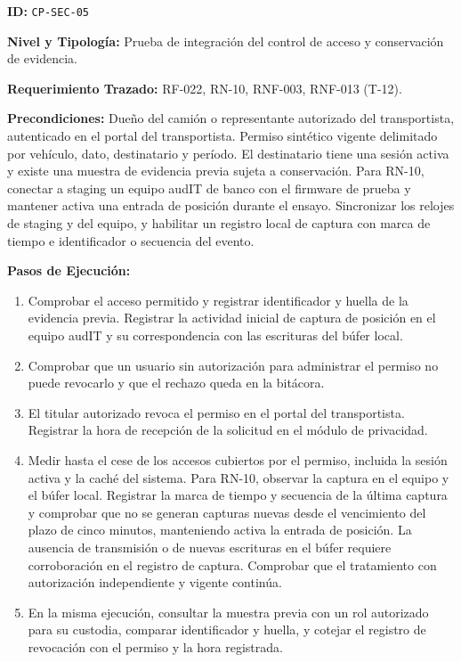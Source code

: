 \par\noindent\textbf{ID:} \texttt{C\allowbreak{}P\allowbreak{}-\allowbreak{}S\allowbreak{}E\allowbreak{}C\allowbreak{}-\allowbreak{}0\allowbreak{}5\allowbreak{}}\par
\par\noindent\textbf{Nivel y Tipología:} Prueba de integración del control de acceso y conservación de evidencia.\par
\par\noindent\textbf{Requerimiento Trazado:} RF-022, RN-10, RNF-003, RNF-013 (T-12).\par
\par\noindent\textbf{Precondiciones:} Dueño del camión o representante autorizado del transportista, autenticado en el portal del transportista. Permiso sintético vigente delimitado por vehículo, dato, destinatario y período. El destinatario tiene una sesión activa y existe una muestra de evidencia previa sujeta a conservación. Para RN-10, conectar a staging un equipo audIT de banco con el firmware de prueba y mantener activa una entrada de posición durante el ensayo. Sincronizar los relojes de staging y del equipo, y habilitar un registro local de captura con marca de tiempo e identificador o secuencia del evento.\par
\par\noindent\textbf{Pasos de Ejecución:}\par
\begin{enumerate}
\item Comprobar el acceso permitido y registrar identificador y huella de la evidencia previa. Registrar la actividad inicial de captura de posición en el equipo audIT y su correspondencia con las escrituras del búfer local.
\item Comprobar que un usuario sin autorización para administrar el permiso no puede revocarlo y que el rechazo queda en la bitácora.
\item El titular autorizado revoca el permiso en el portal del transportista. Registrar la hora de recepción de la solicitud en el módulo de privacidad.
\item Medir hasta el cese de los accesos cubiertos por el permiso, incluida la sesión activa y la caché del sistema. Para RN-10, observar la captura en el equipo y el búfer local. Registrar la marca de tiempo y secuencia de la última captura y comprobar que no se generan capturas nuevas desde el vencimiento del plazo de cinco minutos, manteniendo activa la entrada de posición. La ausencia de transmisión o de nuevas escrituras en el búfer requiere corroboración en el registro de captura. Comprobar que el tratamiento con autorización independiente y vigente continúa.
\item En la misma ejecución, consultar la muestra previa con un rol autorizado para su custodia, comparar identificador y huella, y cotejar el registro de revocación con el permiso y la hora registrada.
\end{enumerate}
